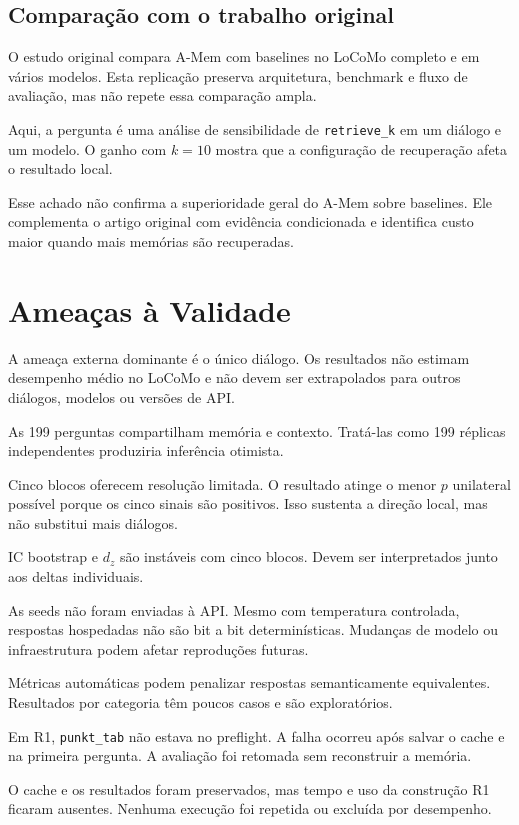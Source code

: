 \documentclass[sigconf]{acmart}
\begin{document}
\subsection{Comparação com o trabalho original}

O estudo original compara A-Mem com baselines no LoCoMo completo e em vários modelos. Esta replicação preserva arquitetura, benchmark e fluxo de avaliação, mas não repete essa comparação ampla.

Aqui, a pergunta é uma análise de sensibilidade de \texttt{retrieve\_k} em um diálogo e um modelo. O ganho com \(k=10\) mostra que a configuração de recuperação afeta o resultado local.

Esse achado não confirma a superioridade geral do A-Mem sobre baselines. Ele complementa o artigo original com evidência condicionada e identifica custo maior quando mais memórias são recuperadas.

\section{Ameaças à Validade}

A ameaça externa dominante é o único diálogo. Os resultados não estimam desempenho médio no LoCoMo e não devem ser extrapolados para outros diálogos, modelos ou versões de API.

As 199 perguntas compartilham memória e contexto. Tratá-las como 199 réplicas independentes produziria inferência otimista.

Cinco blocos oferecem resolução limitada. O resultado atinge o menor \(p\) unilateral possível porque os cinco sinais são positivos. Isso sustenta a direção local, mas não substitui mais diálogos.

IC bootstrap e \(d_z\) são instáveis com cinco blocos. Devem ser interpretados junto aos deltas individuais.

As seeds não foram enviadas à API. Mesmo com temperatura controlada, respostas hospedadas não são bit a bit determinísticas. Mudanças de modelo ou infraestrutura podem afetar reproduções futuras.

Métricas automáticas podem penalizar respostas semanticamente equivalentes. Resultados por categoria têm poucos casos e são exploratórios.

Em R1, \texttt{punkt\_tab} não estava no preflight. A falha ocorreu após salvar o cache e na primeira pergunta. A avaliação foi retomada sem reconstruir a memória.

O cache e os resultados foram preservados, mas tempo e uso da construção R1 ficaram ausentes. Nenhuma execução foi repetida ou excluída por desempenho.
\end{document}

